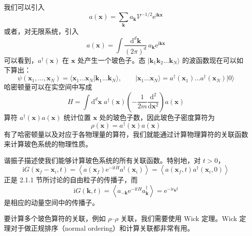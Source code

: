 我们可以引入
\begin{equation*}
a(\pmb{x})=\sum_{\pmb{k}}a_{\pmb{k}}\mathcal{V}^{-1/2}\mathrm{e}^{\mathrm{i}\pmb{k}\pmb{x}}
\end{equation*}
或者，对无限系统，引入
\begin{equation*}
a(\pmb{x})=\int\frac{\mathrm{d}^d\pmb{k}}{(2\pi)^d}\,a_{\pmb{k}}\mathrm{e}^{\mathrm{i}\pmb{k}\pmb{x}}
\end{equation*}
可以看到，$a^{\dagger}(\pmb{x})$ 在 $\pmb{x}$ 处产生一个玻色子。态 $|\pmb{k}_1\pmb{k}_2\ldots\pmb{k}_N\rangle$ 的波函数现在可以如下算出：
\begin{equation*}
\psi(\pmb{x}_1,\ldots,\pmb{x}_N)=\langle\pmb{x}_1\ldots\pmb{x}_N|\pmb{k}_1\ldots\pmb{k}_N\rangle,\qquad |\pmb{x}_1\ldots\pmb{x}_N\rangle=a^{\dagger}(\pmb{x}_1)\ldots a^{\dagger}(\pmb{x}_N)|0\rangle
\end{equation*}
哈密顿量可以在实空间中写成
\begin{equation*}
H=\int \mathrm{d}^d\pmb{x}\;a^{\dagger}(\pmb{x})\left(-\frac{1}{2m}\frac{\mathrm{d}^2}{\mathrm{d}\pmb{x}^2}\right)a(\pmb{x})
\end{equation*}
算符 $a^{\dagger}(\pmb{x})a(\pmb{x})$ 统计位置 $\pmb{x}$ 处的玻色子数，因此玻色子密度算符为
\begin{equation*}
\rho(\pmb{x})=a^{\dagger}(\pmb{x})a(\pmb{x})
\end{equation*}
有了哈密顿量以及对应于各物理量的算符，我们就能通过计算物理算符的关联函数来计算玻色系统的物理性质。

谐振子描述使我们能够计算玻色系统的所有关联函数。特别地，对 $t>0$，
\begin{equation*}
\mathrm{i}G(\pmb{x}_f-\pmb{x}_i,t)=\left\langle a(\pmb{x}_f)\mathrm{e}^{-\mathrm{i}tH}a^{\dagger}(\pmb{x}_i)\right\rangle=\left\langle a(\pmb{x}_f,t)a^{\dagger}(\pmb{x}_i,0)\right\rangle
\end{equation*}
正是 2.1.1 节所讨论的自由粒子的传播子，而
\begin{equation*}
\mathrm{i}G(\pmb{k},t)=\left\langle a_{-\pmb{k}}\mathrm{e}^{-\mathrm{i}tH}a_{\pmb{k}}^{\dagger}\right\rangle=\mathrm{e}^{-\mathrm{i}\epsilon_{\pmb{k}}t}
\end{equation*}
是相应的动量空间中的传播子。

要计算多个玻色算符的关联，例如 $\rho$--$\rho$ 关联，我们需要使用 Wick 定理。Wick 定理对于做正规排序（normal ordering）和计算关联都非常有用。

